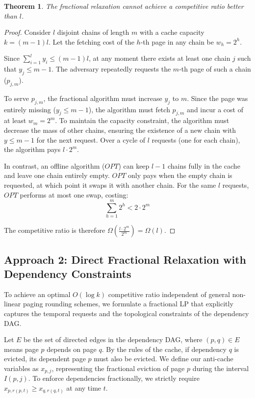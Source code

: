 \documentclass[a4paper]{article}
\newtheorem{theorem}{Theorem}    %
\begin{document}
\begin{theorem}
\label{thm:fractional_lower_bound}
The fractional relaxation cannot achieve a competitive ratio better than $l$.
\end{theorem}
\begin{proof}
Consider $l$ disjoint chains of length $m$ with a cache capacity $k = (m-1)l$. Let the fetching cost of the $h$-th page in any chain be $w_h = 2^h$. 

Since $\sum_{i=1}^l y_i \le (m-1)l$, at any moment there exists at least one chain $j$ such that $y_j \le m-1$. The adversary repeatedly requests the $m$-th page of such a chain ($p_{j,m}$). 

To serve $p_{j,m}$, the fractional algorithm must increase $y_j$ to $m$. Since the page was entirely missing ($y_j \le m-1$), the algorithm must fetch $p_{j,m}$ and incur a cost of at least $w_m = 2^m$. To maintain the capacity constraint, the algorithm must decrease the mass of other chains, ensuring the existence of a new chain with $y \le m-1$ for the next request. Over a cycle of $l$ requests (one for each chain), the algorithm pays $l \cdot 2^m$.

In contrast, an offline algorithm ($OPT$) can keep $l-1$ chains fully in the cache and leave one chain entirely empty. $OPT$ only pays when the empty chain is requested, at which point it swaps it with another chain. For the same $l$ requests, $OPT$ performs at most one swap, costing:
\[
\sum_{h=1}^m 2^h < 2 \cdot 2^m
\]

The competitive ratio is therefore $\Omega(\frac{l \cdot 2^m}{2^m}) = \Omega(l)$.
\end{proof}

\subsection{Approach 2: Direct Fractional Relaxation with Dependency Constraints}

To achieve an optimal $O(\log k)$ competitive ratio independent of general non-linear paging rounding schemes, we formulate a fractional LP that explicitly captures the temporal requests and the topological constraints of the dependency DAG.

Let $E$ be the set of directed edges in the dependency DAG, where $(p, q) \in E$ means page $p$ depends on page $q$. By the rules of the cache, if dependency $q$ is evicted, its dependent page $p$ must also be evicted. We define our anti-cache variables as $x_{p,j}$, representing the fractional eviction of page $p$ during the interval $I(p,j)$. To enforce dependencies fractionally, we strictly require $x_{p,r(p,t)} \ge x_{q,r(q,t)}$ at any time $t$.
\end{document}
